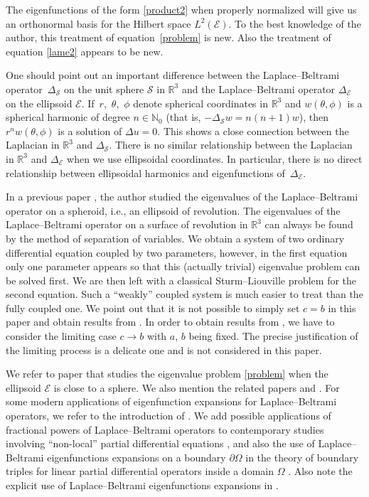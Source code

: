 \documentclass[10pt,a4paper]{amsart}
\newcommand{\R}{\mathbb{R}}
\newcommand{\N}{\mathbb{N}}
\newcommand{\E}{\mathcal{E}}
\newcommand{\Sp}{\mathcal{S}}
\numberwithin{equation}{section}
\begin{document}
The eigenfunctions of the form \eqref{product2} when properly normalized will give us an orthonormal basis
for the Hilbert space $L^2(\E)$.
To the best knowledge of the author, this treatment of equation~\eqref{problem}
is new. Also the treatment of equation \eqref{lame2} appears to be new.

One should point out an important difference between the Laplace--Beltrami operator~$\Delta_\Sp$ on the unit sphere $\Sp$ in $\R^3$ and
the Laplace--Beltrami operator $\Delta_\E$ on the ellipsoid $\E$.
If~$r$,~$\theta$,~$\phi$ denote spherical coordinates in $\R^3$ and $w(\theta,\phi)$ is a spherical harmonic of degree $n\in\N_0$ (that is, $-\Delta_\Sp w=n(n+1)w$), then $r^nw(\theta,\phi)$ is a solution of $\Delta u=0$.
This shows a close connection between the Laplacian in $\R^3$ and $\Delta_\Sp$.
There is no similar relationship between the Laplacian in $\R^3$ and $\Delta_\E$ when we use ellipsoidal coordinates. In particular,
there is no direct relationship between ellipsoidal harmonics and eigenfunctions of~$\Delta_\E$.

In a previous paper \cite{V}, the author studied the eigenvalues of the Laplace--Beltrami operator on a spheroid, i.e., an ellipsoid of revolution.
The eigenvalues of the Laplace--Beltrami operator on a surface of revolution in $\R^3$ can always be found by the method of separation of variables.
We obtain a system of two ordinary differential equation coupled by two parameters, however, in the first equation only
one parameter appears so that this (actually trivial) eigenvalue problem can be solved first.
We are then left with a classical Sturm--Liouville problem for the second equation.
Such a ``weakly'' coupled system is much easier to treat than the fully coupled one.
We point out that it is not possible to simply set $c=b$ in this paper and obtain results from \cite{V}.
In order to obtain results from \cite{V}, we have to consider the limiting case $c\to b$ with $a$, $b$ being fixed.
The precise justification of the limiting process is a delicate one and is not considered in this paper.

We refer to paper \cite{EK} that studies the eigenvalue problem \eqref{problem} when the ellipsoid $\E$ is close to a sphere.
We also mention the related papers \cite{BF} and \cite{MT}.
For some modern applications of eigenfunction expansions for Laplace--Beltrami operators, we refer to the introduction of \cite{EK}.
We add possible applications of fractional powers of Laplace--Beltrami operators to contemporary studies involving ``non-local''
partial differential equations
\cite{GGL}, and also the use of Laplace--Beltrami eigenfunctions expansions on a boundary $\partial\Omega$ in the theory of boundary triples
for linear partial differential operators inside a domain $\Omega$ \cite[Theorem 3.2]{KZ}.
Also note the explicit use of Laplace--Beltrami eigenfunctions expansions in \cite[Section~1 and Theorems 2.2--2.4]{EKa}.
\end{document}
